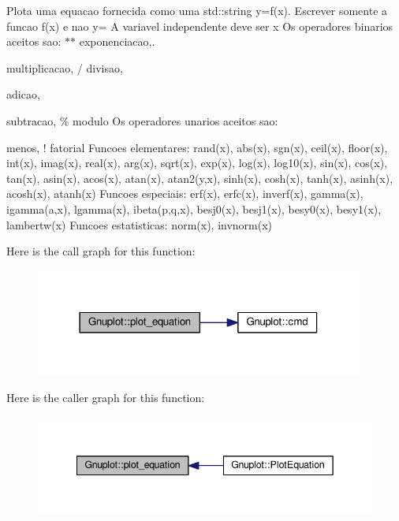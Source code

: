 Plota uma equacao fornecida como uma std\-::string y=f(x). Escrever somente a funcao f(x) e nao y= A variavel independente deve ser x Os operadores binarios aceitos sao\-: $\ast$$\ast$ exponenciacao,. 


\begin{DoxyItemize}
\item multiplicacao, / divisao,
\end{DoxyItemize}

adicao,
\begin{DoxyItemize}
\item subtracao, \% modulo Os operadores unarios aceitos sao\-:
\item menos, ! fatorial Funcoes elementares\-: rand(x), abs(x), sgn(x), ceil(x), floor(x), int(x), imag(x), real(x), arg(x), sqrt(x), exp(x), log(x), log10(x), sin(x), cos(x), tan(x), asin(x), acos(x), atan(x), atan2(y,x), sinh(x), cosh(x), tanh(x), asinh(x), acosh(x), atanh(x) Funcoes especiais\-: erf(x), erfc(x), inverf(x), gamma(x), igamma(a,x), lgamma(x), ibeta(p,q,x), besj0(x), besj1(x), besy0(x), besy1(x), lambertw(x) Funcoes estatisticas\-: norm(x), invnorm(x) 
\end{DoxyItemize}

Here is the call graph for this function\-:
\nopagebreak
\begin{figure}[H]
\begin{center}
\leavevmode
\includegraphics[width=306pt]{classGnuplot_a42dfb8c9d4636745c7be277ed818e849_cgraph}
\end{center}
\end{figure}




Here is the caller graph for this function\-:
\nopagebreak
\begin{figure}[H]
\begin{center}
\leavevmode
\includegraphics[width=342pt]{classGnuplot_a42dfb8c9d4636745c7be277ed818e849_icgraph}
\end{center}
\end{figure}


